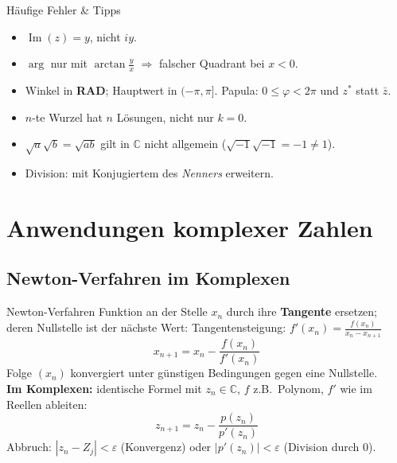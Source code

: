 \documentclass[a4paper, fontsize=7pt]{scrartcl}
\def\C{\mathbb{C}}  %
\begin{document}
\begin{subbox}{Häufige Fehler \& Tipps}
\begin{itemize}
    \item $\operatorname{Im}(z) = y$, nicht $iy$.
    \item $\arg$ nur mit $\arctan\frac{y}{x}$ $\Rightarrow$ falscher
          Quadrant bei $x < 0$.
    \item Winkel in \textbf{RAD}; Hauptwert in $(-\pi, \pi]$.
          Papula: $0 \le \varphi < 2\pi$ und $z^*$ statt $\bar z$.
    \item $n$-te Wurzel hat $n$ Lösungen, nicht nur $k = 0$.
    \item $\sqrt{a}\sqrt{b} = \sqrt{ab}$ gilt in $\C$ nicht allgemein
          ($\sqrt{-1}\sqrt{-1} = -1 \ne 1$).
    \item Division: mit Konjugiertem des \emph{Nenners} erweitern.
\end{itemize}
\end{subbox}

\section{Anwendungen komplexer Zahlen}

\subsection{Newton-Verfahren im Komplexen}

\begin{mainbox}{Newton-Verfahren}
Funktion an der Stelle $x_n$ durch ihre \textbf{Tangente} ersetzen;
deren Nullstelle ist der nächste Wert:
Tangentensteigung: $f'(x_n) = \frac{f(x_n)}{x_n - x_{n+1}}$
$$\boxed{x_{n+1} = x_n - \frac{f(x_n)}{f'(x_n)}}$$
Folge $(x_n)$ konvergiert unter günstigen Bedingungen gegen eine
Nullstelle.\\
\textbf{Im Komplexen:} identische Formel mit $z_n \in \C$, $f$ z.B.\
Polynom, $f'$ wie im Reellen ableiten:
$$z_{n+1} = z_n - \frac{p(z_n)}{p'(z_n)}$$
Abbruch: $|z_n - Z_j| < \varepsilon$ (Konvergenz) oder
$|p'(z_n)| < \varepsilon$ (Division durch 0).
\end{mainbox}
\end{document}
